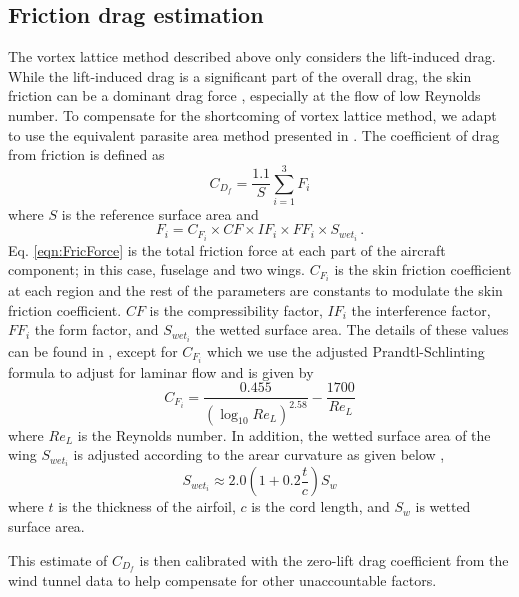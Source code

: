 \documentclass[11pt]{ucthesis}
\begin{document}
\subsection{Friction drag estimation}
The vortex lattice method described above only considers the lift-induced drag. While the lift-induced drag is a significant part of the overall drag, the skin friction can be a dominant drag force \cite{thomas1984aircraft}, especially at the flow of low Reynolds number. To compensate for the shortcoming of vortex lattice method, we adapt to use the equivalent parasite area method presented in \cite{hull2007fundamentals}. The coefficient of drag from friction is defined as 
\begin{equation}
C_{D_f} = \frac{1.1}{S} \sum_{i=1}^{3} F_i
\end{equation}
where $S$ is the reference surface area and 
\begin{equation}
F_i = C_{F_i}\times CF\times IF_i\times FF_i\times S_{{wet}_i} \,.
\label{eqn:FricForce}
\end{equation}
Eq. \ref{eqn:FricForce} is the total friction force at each part of the aircraft component; in this case, fuselage and two wings. $C_{F_i}$ is the skin friction coefficient at each region and the rest of the parameters are constants to modulate the skin friction coefficient. $CF$ is the compressibility factor, $IF_i$ the interference factor, $FF_i$ the form factor, and $S_{{wet}_i}$ the wetted surface area. The details of these values can be found in \cite{hull2007fundamentals}, except for $C_{F_i}$ which we use the adjusted Prandtl-Schlinting formula to adjust for laminar flow and is given by \cite{bertin1998aerodynamics}
\begin{equation} \label{cfi_1}
C_{F_i} = \frac{0.455}{(\log_{10} Re_L)^{2.58}}-\frac{1700}{Re_L}
\end{equation} 
where $Re_L$ is the Reynolds number. In addition, the wetted surface area of the wing $S_{{wet}_i}$ is adjusted according to the arear curvature as given below \cite{bertin1998aerodynamics},
\begin{equation}
S_{{wet}_i}\approx 2.0 \left (1+0.2\frac{t}{c} \right ) S_w
\label{eqn:wetWing}
\end{equation}
where $t$ is the thickness of the airfoil, $c$ is the cord length, and $S_w$ is wetted surface area.

This estimate of $C_{D_f}$ is then calibrated with the zero-lift drag coefficient from the wind tunnel data to help compensate for other unaccountable factors.
\end{document}
